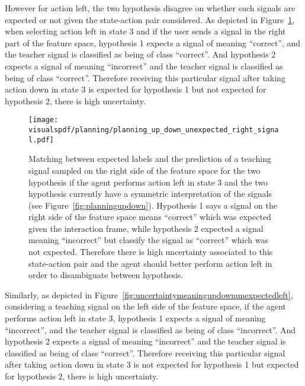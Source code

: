 However for action left, the two hypothesis disagree on whether such signals are expected or not given the state-action pair considered. As depicted in Figure~\ref{fig:uncertaintymeaningupdownunexpectedright}, when selecting action left in state 3 and if the user sends a signal in the right part of the feature space, hypothesis 1 expects a signal of meaning ``correct'', and the teacher signal is classified as being of class ``correct''. And hypothesis 2 expects a signal of meaning ``incorrect'' and the teacher signal is classified as being of class ``correct''. Therefore receiving this particular signal after taking action down in state 3 is expected for hypothesis 1 but not expected for hypothesis 2, there is high uncertainty.

\begin{figure}[!htbp]
  \centering
  \texttt{[image: \\visualspdf/planning/planning\_up\_down\_unexpected\_right\_signal.pdf]}
  \caption{Matching between expected labels and the prediction of a teaching signal sampled on the right side of the feature space for the two hypothesis if the agent performs action left in state 3 and the two hypothesis currently have a symmetric interpretation of the signals (see Figure~\ref{fig:planningupdown}). Hypothesis 1 says a signal on the right side of the feature space means ``correct'' which was expected given the interaction frame, while hypothesis 2 expected a signal meaning ``incorrect'' but classify the signal as ``correct'' which was not expected. Therefore there is high uncertainty associated to this state-action pair and the agent should better perform action left in order to disambiguate between hypothesis.}
  \label{fig:uncertaintymeaningupdownunexpectedright}
\end{figure}

Similarly, as depicted in Figure~\ref{fig:uncertaintymeaningupdownunexpectedleft}, considering a teaching signal on the left side of the feature space, if the agent performs action left in state 3, hypothesis 1 expects a signal of meaning ``incorrect'', and the teacher signal is classified as being of class ``incorrect''. And hypothesis 2 expects a signal of meaning ``incorrect'' and the teacher signal is classified as being of class ``correct''. Therefore receiving this particular signal after taking action down in state 3 is not expected for hypothesis 1 but expected for hypothesis 2, there is high uncertainty.

